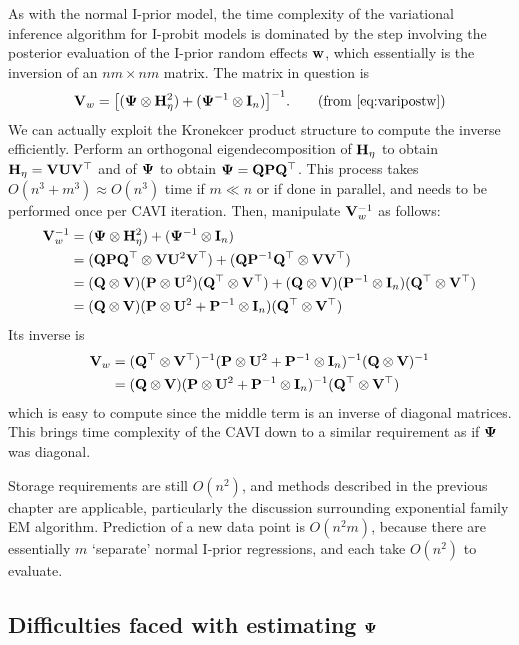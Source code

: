 As with the normal I-prior model, the time complexity of the variational inference algorithm for I-probit models is dominated by the step involving the posterior evaluation of the I-prior random effects ${\mathbf w}$, which essentially is the inversion of an $nm \times nm$ matrix.
The matrix in question is %
\begin{align}
  \bV_w = \big[ (\bPsi \otimes \bH_\eta^2) + (\bPsi^{-1} \otimes \bI_n) \big]^{-1}. \tag{from \ref{eq:varipostw}}
\end{align}
We can actually exploit the Kronekcer product structure to compute the inverse efficiently.
Perform an orthogonal eigendecomposition of ${\mathbf H}_\eta$ to obtain ${\mathbf H}_\eta = {\mathbf V}{\mathbf U}{\mathbf V}^\top$ and of ${\bm\Psi}$ to obtain ${\bm\Psi} = {\mathbf Q}{\mathbf P}{\mathbf Q}^\top$.
This process takes $O(n^3 + m^3) \approx O(n^3)$ time if $m\ll n$ or if done in parallel, and needs to be performed once per CAVI iteration.
Then, manipulate ${\mathbf V}_w^{-1}$ as follows:
\begin{align*}
  {\mathbf V}_w^{-1} 
  &= ({\bm\Psi} \otimes {\mathbf H}_\eta^2) + ({\bm\Psi}^{-1} \otimes {\mathbf I}_n) \\
  &= ({\mathbf Q}{\mathbf P}{\mathbf Q}^\top \otimes {\mathbf V}{\mathbf U}^2{\mathbf V}^\top) + ({\mathbf Q}{\mathbf P}^{-1}{\mathbf Q}^\top \otimes {\mathbf V}{\mathbf V}^\top) \\
  &= ({\mathbf Q} \otimes {\mathbf V})({\mathbf P} \otimes {\mathbf U}^2)({\mathbf Q}^\top \otimes {\mathbf V}^\top) + 
  ({\mathbf Q} \otimes {\mathbf V})({\mathbf P}^{-1} \otimes {\mathbf I}_n)({\mathbf Q}^\top \otimes {\mathbf V}^\top) \\
  &= ({\mathbf Q} \otimes {\mathbf V})({\mathbf P} \otimes {\mathbf U}^2 + {\mathbf P}^{-1} \otimes {\mathbf I}_n)({\mathbf Q}^\top \otimes {\mathbf V}^\top) 
\end{align*}
Its inverse is 
\begin{align*}
  {\mathbf V}_w 
  &=  ({\mathbf Q}^\top \otimes {\mathbf V}^\top)^{-1}({\mathbf P} \otimes {\mathbf U}^2 + {\mathbf P}^{-1} \otimes {\mathbf I}_n)^{-1} ({\mathbf Q} \otimes {\mathbf V})^{-1} \\
  &= ({\mathbf Q} \otimes {\mathbf V})({\mathbf P} \otimes {\mathbf U}^2 + {\mathbf P}^{-1} \otimes {\mathbf I}_n)^{-1}({\mathbf Q}^\top \otimes {\mathbf V}^\top)
\end{align*}
which is easy to compute since the middle term is an inverse of diagonal matrices.
This brings time complexity of the CAVI down to a similar requirement as if ${\bm\Psi}$ was diagonal.

Storage requirements are still $O(n^2)$, and methods described in the previous chapter are applicable, particularly the discussion surrounding exponential family EM algorithm.
Prediction of a new data point is $O(n^2m)$, because there are essentially $m$ `separate' normal I-prior regressions, and each take $O(n^2)$ to evaluate.

\subsection{Difficulties faced with estimating \texorpdfstring{${\bm\Psi}$}{$\Psi$}}
\label{sec:difficultPsi}

